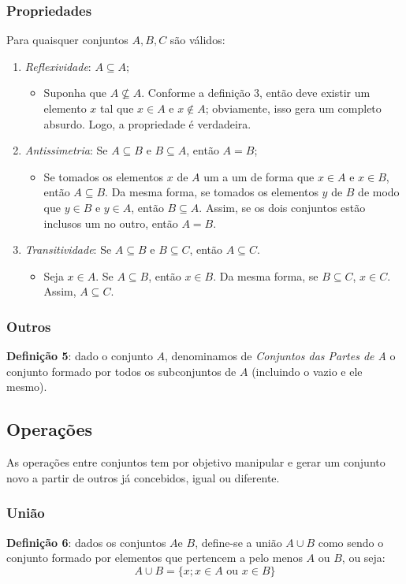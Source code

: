 \documentclass{article}
\begin{document}
\subsubsection{Propriedades} 
Para quaisquer conjuntos $A, B, C$ são válidos:
\begin{enumerate}
    \item \emph{Reflexividade}: $A \subseteq A$;
    \begin{itemize}
        \item Suponha que $A \nsubseteq A$. Conforme a definição 3, então deve existir um elemento $x$ tal que $x \in A$ e $x \notin A$; obviamente, isso gera um completo absurdo. Logo, a propriedade é verdadeira.
    \end{itemize}
    \item \emph{Antissimetria}: Se $A \subseteq B$ e $B \subseteq A$, então $A = B$;
    \begin{itemize}
        \item Se tomados os elementos $x$ de $A$ um a um de forma que $x \in A$ e $x \in B$, então $A \subseteq B$. Da mesma forma, se tomados os elementos $y$ de $B$ de modo que $y \in B$ e $y \in A$, então $B \subseteq A$. Assim, se os dois conjuntos estão inclusos um no outro, então $A = B$.
    \end{itemize}
    \item \emph{Transitividade}: Se $A \subseteq B$ e $B \subseteq C$, então $A \subseteq C$.
    \begin{itemize}
        \item Seja $x \in A$. Se $A \subseteq B$, então $x \in B$. Da mesma forma, se $B \subseteq C$, $x \in C$. Assim, $A \subseteq C$.
    \end{itemize}
\end{enumerate}
\subsubsection{Outros}
\textbf{Definição 5}: dado o conjunto $A$, denominamos de \emph{Conjuntos das Partes de A} o conjunto formado por todos os subconjuntos de $A$ (incluindo o vazio e ele mesmo).

\subsection{Operações}
As operações entre conjuntos tem por objetivo manipular e gerar um conjunto novo a partir de outros já concebidos, igual ou diferente.

\subsubsection{União}
\textbf{Definição 6}: dados os conjuntos $A$e $B$, define-se a união $A \cup B$ como sendo o conjunto formado por elementos que pertencem a pelo menos $A$ ou $B$, ou seja:
\begin{displaymath}
    A \cup B = \{ x; x \in A \text{ ou } x \in B \}
\end{displaymath}
\end{document}

